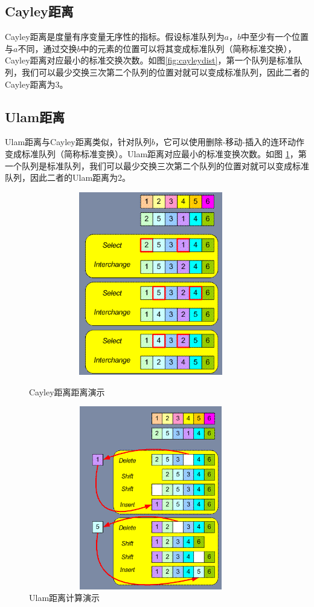 \subsection{Cayley距离}
Cayley距离是度量有序变量无序性的指标。假设标准队列为$a$，$b$中至少有一个位置与$a$不同，通过交换$b$中的元素的位置可以将其变成标准队列（简称标准交换），Cayley距离对应最小的标准交换次数。如图\ref{fig:cayleydist}，第一个队列是标准队列，我们可以最少交换三次第二个队列的位置对就可以变成标准队列，因此二者的Cayley距离为3。

\subsection{Ulam距离}
Ulam距离与Cayley距离类似，针对队列$b$，它可以使用删除-移动-插入的连环动作变成标准队列（简称标准变换）。Ulam距离对应最小的标准变换次数。如图
\ref{fig:ulamdist}，第一个队列是标准队列，我们可以最少交换三次第二个队列的位置对就可以变成标准队列，因此二者的Ulam距离为2。

\begin{figure}[htbp]
    \begin{minipage}[t]{0.49\linewidth}
        \centering
          \includegraphics[width=0.95\textwidth,height=8cm]{figures/cayleydist}
          \caption{Cayley距离距离演示}\label{fig:cayleydist}
    \end{minipage}
    \begin{minipage}[t]{0.49\linewidth}
        \centering
          \includegraphics[width=0.95\textwidth,height=8cm]{figures/ulamdist}
          \caption{Ulam距离计算演示}\label{fig:ulamdist}
    \end{minipage}
\end{figure}

